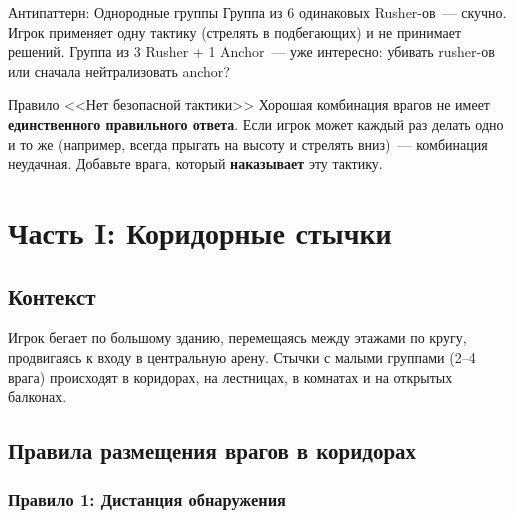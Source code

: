 \documentclass[a4paper,11pt]{report}
\begin{document}
\begin{warning}{Антипаттерн: Однородные группы}
Группа из 6 одинаковых Rusher-ов~--- скучно. Игрок применяет
одну тактику (стрелять в подбегающих) и не принимает решений.
Группа из 3 Rusher + 1 Anchor~--- уже интересно: убивать rusher-ов
или сначала нейтрализовать anchor?
\end{warning}

\begin{rulebox}{Правило <<Нет безопасной тактики>>}
Хорошая комбинация врагов не имеет \textbf{единственного правильного
ответа}. Если игрок может каждый раз делать одно и то же (например,
всегда прыгать на высоту и стрелять вниз)~--- комбинация неудачная.
Добавьте врага, который \textbf{наказывает} эту тактику.
\end{rulebox}


\chapter{Часть I: Коридорные стычки}

\section{Контекст}

Игрок бегает по большому зданию, перемещаясь между этажами по
кругу, продвигаясь к входу в центральную арену. Стычки с малыми
группами (2--4 врага) происходят в коридорах, на лестницах,
в комнатах и на открытых балконах.

\section{Правила размещения врагов в коридорах}

\subsection{Правило 1: Дистанция обнаружения}
\end{document}
